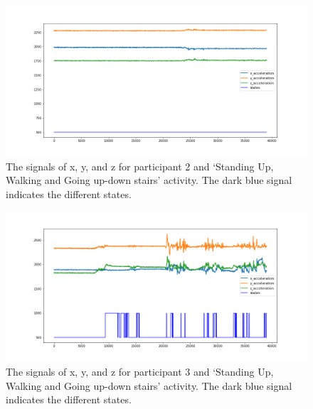 \begin{figure}[H]
    \centering
    \begin{minipage}[b]{1\textwidth}
        \includegraphics[width=\textwidth]{manuscript/src/figures/Ass3/Ass3_Q2_states_user_1.png}
    \end{minipage}
    \caption{The signals of x, y, and z for participant 2 and ‘Standing  Up,  Walking  and  Going  up-down  stairs’ activity. The dark blue signal indicates the different states.}
    \label{fig:Ass3_Q2_states_user_1}
\end{figure}
\begin{figure}[H]
    \centering
    \begin{minipage}[b]{1\textwidth}
        \includegraphics[width=\textwidth]{manuscript/src/figures/Ass3/Ass3_Q2_states_user_2.png}
    \end{minipage}
    \caption{The signals of x, y, and z for participant 3 and ‘Standing  Up,  Walking  and  Going  up-down  stairs’ activity. The dark blue signal indicates the different states.}
    \label{fig:Ass3_Q2_states_user_2}
\end{figure}
